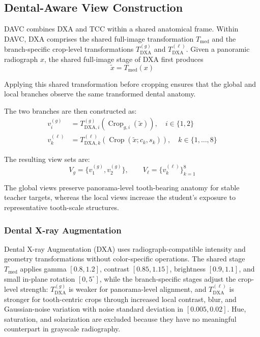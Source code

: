 \documentclass[conference]{IEEEtran}
\newcommand{\DAVC}{\textsc{DAVC}}
\newcommand{\DXA}{\textsc{DXA}}
\newcommand{\TCC}{\textsc{TCC}}
\begin{document}
\subsection{Dental-Aware View Construction}
\label{sec:davc}

\DAVC{} combines \DXA{} and \TCC{} within a shared anatomical frame. Within \DAVC{}, \DXA{} comprises the shared full-image transformation $T_{\mathrm{med}}$ and the branch-specific crop-level transformations $T_{\mathrm{DXA}}^{(g)}$ and $T_{\mathrm{DXA}}^{(\ell)}$. Given a panoramic radiograph $x$, the shared full-image stage of \DXA{} first produces
\begin{equation}
\label{eq:shared-medical-augmentation}
\tilde{x}=T_{\mathrm{med}}(x)
\end{equation}

Applying this shared transformation before cropping ensures that the global and local branches observe the same transformed dental anatomy.

The two branches are then constructed as:
\begin{align}
v_i^{(g)}
&=
T_{\mathrm{DXA},i}^{(g)}
\left(
\operatorname{Crop}_{g,i}(\tilde{x})
\right),
\quad i\in\{1,2\}
\label{eq:davc-global-views}
\\
v_k^{(\ell)}
&=
T_{\mathrm{DXA},k}^{(\ell)}
\left(
\operatorname{Crop}(\tilde{x};c_k,s_k)
\right),
\quad k\in\{1,\ldots,8\}
\label{eq:davc-local-views}
\end{align}

The resulting view sets are:
\begin{equation}
\label{eq:davc-view-sets}
V_g=\{v_1^{(g)},v_2^{(g)}\},
\qquad
V_\ell=\{v_k^{(\ell)}\}_{k=1}^{8}
\end{equation}

The global views preserve panorama-level tooth-bearing anatomy for stable teacher targets, whereas the local views increase the student's exposure to representative tooth-scale structures.

\subsubsection{Dental X-ray Augmentation}

Dental X-ray Augmentation (\DXA{}) uses radiograph-compatible intensity and geometry transformations without color-specific operations. The shared stage $T_{\mathrm{med}}$ applies gamma $[0.8,1.2]$, contrast $[0.85,1.15]$, brightness $[0.9,1.1]$, and small in-plane rotation $[0,5^\circ]$, while the branch-specific stages adjust the crop-level strength: $T_{\mathrm{DXA}}^{(g)}$ is weaker for panorama-level alignment, and $T_{\mathrm{DXA}}^{(\ell)}$ is stronger for tooth-centric crops through increased local contrast, blur, and Gaussian-noise variation with noise standard deviation in $[0.005,0.02]$. Hue, saturation, and solarization are excluded because they have no meaningful counterpart in grayscale radiography.
\end{document}
